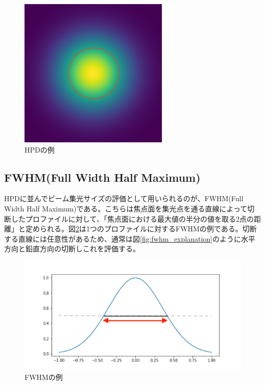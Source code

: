 \documentclass[dvipdfmx,autodetect-engine]{jreport}
\begin{document}
\begin{figure}[h!]
\centering
\includegraphics[scale=0.6]{images/error_simulation/explanation/HPD.png}
\caption{HPDの例}
\label{fig:hpd_explanation}
\end{figure}

\subsection{FWHM(Full Width Half Maximum)}
HPDに並んでビーム集光サイズの評価として用いられるのが、FWHM(Full Width Half Maximum)である。こちらは焦点面を集光点を通る直線によって切断したプロファイルに対して、「焦点面における最大値の半分の値を取る2点の距離」と定められる。図\ref{fig:fwhm_explanation_profile}は1つのプロファイルに対するFWHMの例である。切断する直線には任意性があるため、通常は図\ref{fig:fwhm_explanation}のように水平方向と鉛直方向の切断しこれを評価する。

\begin{figure}[h!]
\centering
\includegraphics[scale=0.6]{images/error_simulation/explanation/FWHM.png}
\caption{FWHMの例}
\label{fig:fwhm_explanation_profile}
\end{figure}
\end{document}
